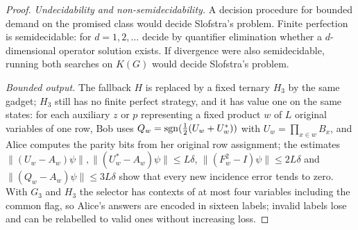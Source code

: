 \begin{proof}
\emph{Undecidability and non-semidecidability.} A decision procedure for bounded demand on the promised class would decide
Slofstra's problem. Finite perfection is semidecidable: for $d=1,2,\dots$ decide by quantifier elimination whether a
$d$-dimensional operator solution exists. If divergence were also semidecidable, running both searches on $K(G)$ would
decide Slofstra's problem.

\emph{Bounded output.} The fallback $H$ is replaced by a fixed ternary $H_3$ by the same gadget; $H_3$ still has no finite
perfect strategy, and it has value one on the same states: for each auxiliary $z$ or $p$ representing a fixed product $w$
of $L$ original variables of one row, Bob uses $Q_w=\operatorname{sgn}(\frac12(U_w+U_w^*))$ with $U_w=\prod_{x\in w}B_x$, and Alice computes
the parity bits from her original row assignment; the estimates $\|(U_w-A_w)\psi\|,\|(U_w^*-A_w)\psi\|\le L\delta$,
$\|(F_w^2-I)\psi\|\le2L\delta$ and $\|(Q_w-A_w)\psi\|\le3L\delta$ show that every new incidence error tends to zero. With
$G_3$ and $H_3$ the selector has contexts of at most four variables including the common flag, so Alice's answers are
encoded in sixteen labels; invalid labels lose and can be relabelled to valid ones without increasing loss.
\end{proof}

